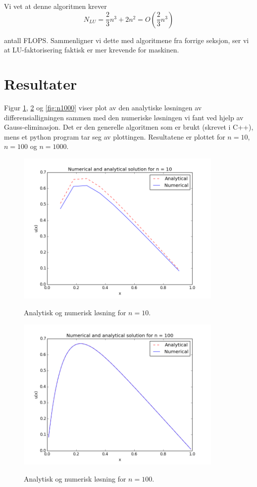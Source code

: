 \documentclass{article}
\begin{document}
Vi vet at denne algoritmen krever
\begin{equation}
N_{LU} = \frac{2}{3}n^3 + 2n^2 = O(\frac{2}{3}n^3)
\end{equation}

antall FLOPS. Sammenligner vi dette med algoritmene fra forrige seksjon, ser vi at LU-faktorisering faktisk er mer krevende for maskinen.


\section{Resultater}

Figur \ref{fig:n10}, \ref{fig:n100} og \ref{fig:n1000} viser plot av den analytiske løsningen av differensialligningen sammen med den numeriske løsningen vi fant ved hjelp av Gauss-eliminasjon. Det er den generelle algoritmen som er brukt (skrevet i C++), mens et python program tar seg av plottingen. Resultatene er plottet for $n=10$, $n=100$ og $n=1000$.

\FloatBarrier
\begin{figure}[!ht]
  \begin{center}
  \includegraphics[width = 100mm]{b_n10.png}\\
  \caption{Analytisk og numerisk løsning for $n=10$.}\label{fig:n10}
  \end{center}
\end{figure}
\FloatBarrier

\FloatBarrier
\begin{figure}[!ht]
  \begin{center}
  \includegraphics[width = 100mm]{b_n100.png}\\
  \caption{Analytisk og numerisk løsning for $n=100$.}\label{fig:n100}
  \end{center}
\end{figure}
\FloatBarrier
\end{document}
